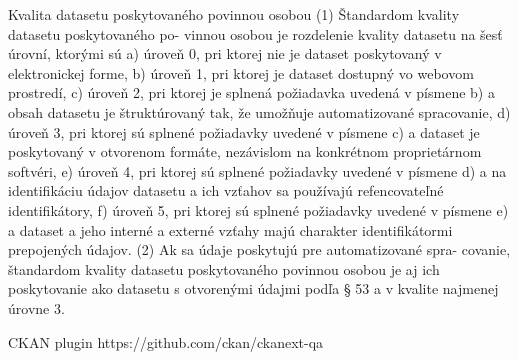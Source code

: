 \documentclass[12pt,a4paper]{article}
\begin{document}
Kvalita datasetu poskytovaného povinnou osobou
(1) Štandardom kvality datasetu poskytovaného po-
vinnou osobou je rozdelenie kvality datasetu na šesť
úrovní, ktorými sú
a) úroveň 0, pri ktorej nie je dataset poskytovaný
v elektronickej forme,
b) úroveň 1, pri ktorej je dataset dostupný vo webovom
prostredí,
c) úroveň 2, pri ktorej je splnená požiadavka uvedená
v písmene b) a obsah datasetu je štruktúrovaný tak,
že umožňuje automatizované spracovanie,
d) úroveň 3, pri ktorej sú splnené požiadavky uvedené
v písmene c) a dataset je poskytovaný v otvorenom
formáte, nezávislom na konkrétnom proprietárnom
softvéri,
e) úroveň 4, pri ktorej sú splnené požiadavky uvedené
v písmene d) a na identifikáciu údajov datasetu a ich
vzťahov sa používajú refencovateľné identifikátory,
f) úroveň 5, pri ktorej sú splnené požiadavky uvedené
v písmene e) a dataset a jeho interné a externé
vzťahy majú charakter identifikátormi prepojených
údajov.
(2) Ak sa údaje poskytujú pre automatizované spra-
covanie, štandardom kvality datasetu poskytovaného
povinnou osobou je aj ich poskytovanie ako datasetu
s otvorenými údajmi podľa § 53 a v kvalite najmenej
úrovne 3.

CKAN plugin 
https://github.com/ckan/ckanext-qa
\end{document}
